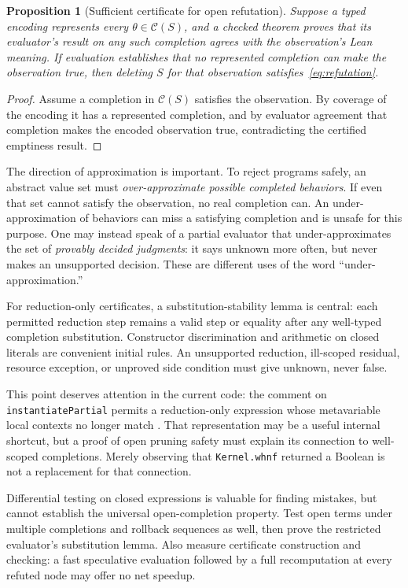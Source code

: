 \documentclass[11pt,a4paper]{article}
\newtheorem{proposition}[theorem]{Proposition}
\theoremstyle{definition}
\theoremstyle{remark}
\newcommand{\code}[1]{\texttt{#1}}
\begin{document}
\begin{proposition}[Sufficient certificate for open refutation]
Suppose a typed encoding represents every $\theta\in\mathcal C(S)$, and a
checked theorem proves that its evaluator's result on any such completion
agrees with the observation's Lean meaning. If evaluation establishes that
no represented completion can make the observation true, then deleting $S$
for that observation satisfies~\eqref{eq:refutation}.
\end{proposition}
\begin{proof}
Assume a completion in $\mathcal C(S)$ satisfies the observation. By coverage
of the encoding it has a represented completion, and by evaluator agreement
that completion makes the encoded observation true, contradicting the
certified emptiness result.
\end{proof}

The direction of approximation is important. To reject programs safely, an
abstract value set must \emph{over-approximate possible completed behaviors}.
If even that set cannot satisfy the observation, no real completion can.
An under-approximation of behaviors can miss a satisfying completion and is
unsafe for this purpose. One may instead speak of a partial evaluator that
under-approximates the set of \emph{provably decided judgments}: it says unknown
more often, but never makes an unsupported decision. These are different uses
of the word ``under-approximation.''

For reduction-only certificates, a substitution-stability lemma is central:
each permitted reduction step remains a valid step or equality after any
well-typed completion substitution. Constructor discrimination and arithmetic
on closed literals are convenient initial rules. An unsupported reduction,
ill-scoped residual, resource exception, or unproved side condition must give
unknown, never false.

This point deserves attention in the current code: the comment on
\code{instantiatePartial} permits a reduction-only expression whose
metavariable local contexts no longer match \cite{srcsearch}. That representation
may be a useful internal shortcut, but a proof of open pruning safety must
explain its connection to well-scoped completions. Merely observing that
\code{Kernel.whnf} returned a Boolean is not a replacement for that connection.

Differential testing on closed expressions is valuable for finding mistakes,
but cannot establish the universal open-completion property. Test open terms
under multiple completions and rollback sequences as well, then prove the
restricted evaluator's substitution lemma. Also measure certificate construction
and checking: a fast speculative evaluation followed by a full recomputation
at every refuted node may offer no net speedup.
\end{document}
